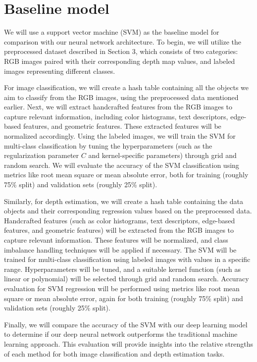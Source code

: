 \documentclass{article} %
\begin{document}



\section{Baseline model}

We will use a support vector machine (SVM) as the baseline model for comparison with our neural network architecture. To begin, we will utilize the preprocessed dataset described in Section 3, which consists of two categories: RGB images paired with their corresponding depth map values, and labeled images representing different classes.

For image classification, we will create a hash table containing all the objects we aim to classify from the RGB images, using the preprocessed data mentioned earlier. Next, we will extract handcrafted features from the RGB images to capture relevant information, including color histograms, text descriptors, edge-based features, and geometric features. These extracted features will be normalized accordingly. Using the labeled images, we will train the SVM for multi-class classification by tuning the hyperparameters (such as the regularization parameter $\displaystyle C$ and kernel-specific parameters) through grid and random search. We will evaluate the accuracy of the SVM classification using metrics like root mean square or mean absolute error, both for training (roughly 75\% split) and validation sets (roughly 25\% split).

Similarly, for depth estimation, we will create a hash table containing the data objects and their corresponding regression values based on the preprocessed data. Handcrafted features (such as color histograms, text descriptors, edge-based features, and geometric features) will be extracted from the RGB images to capture relevant information. These features will be normalized, and class imbalance handling techniques will be applied if necessary. The SVM will be trained for multi-class classification using labeled images with values in a specific range. Hyperparameters will be tuned, and a suitable kernel function (such as linear or polynomial) will be selected through grid and random search. Accuracy evaluation for SVM regression will be performed using metrics like root mean square or mean absolute error, again for both training (roughly 75\% split) and validation sets (roughly 25\% split).

Finally, we will compare the accuracy of the SVM with our deep learning model to determine if our deep neural network outperforms the traditional machine learning approach. This evaluation will provide insights into the relative strengths of each method for both image classification and depth estimation tasks.
\end{document}
